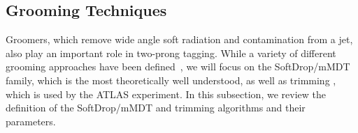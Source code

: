 \documentclass[11pt]{cernrep}
\begin{document}
\subsection{Grooming Techniques}\label{jetsub_2prong_sec:groom_tech}

Groomers, which remove wide angle soft radiation and contamination from a jet, also play an important role in two-prong tagging.
%
While a variety of different grooming approaches have been defined~\cite{Butterworth:2008iy,Ellis:2009su,Ellis:2009me,Krohn:2009th,Dasgupta:2013via,Dasgupta:2013ihk}, we will focus on the SoftDrop/mMDT family, which is the most theoretically well understood, as well as trimming \cite{Krohn:2009th}, which is used by the ATLAS experiment.
%
In this subsection, we review the definition of the SoftDrop/mMDT and trimming algorithms and their parameters.
\end{document}
